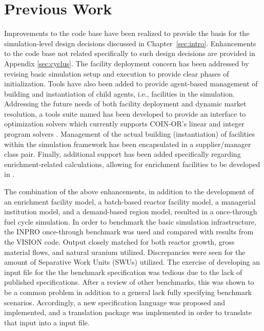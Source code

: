 \chapter{Previous Work}\label{ch:prevwork}

Improvements to the \Cyclus code base have been realized to provide the basis
for the simulation-level design decisions discussed in
Chapter~\ref{sec:intro}. Enhancements to the code base not related specifically
to such design decisions are provided in Appendix \ref{sec:cyclus}. The facility
deployment concern has been addressed by revising basic simulation setup and
execution to provide clear phases of initialization. Tools have also been added
to provide agent-based management of building and instantiation of child agents,
i.e., facilities in the \Cyclus simulation. Addressing the future needs of both
facility deployment and dynamic market resolution, a tools suite named \Cyclopts
has been developed to provide an interface to optimization solvers which
currently supports COIN-OR's linear and integer program solvers
\cite{lougee_common_2003}. Management of the actual building (instantiation) of
facilities within the simulation framework has been encapsulated in a
supplier/manager class pair. Finally, additional support has been added
specifically regarding enrichment-related calculations, allowing for enrichment
facilities to be developed in \Cycamore.

The combination of the above enhancements, in addition to the development of an
enrichment facility model, a batch-based reactor facility model, a managerial
institution model, and a demand-based region model, resulted in a \Cyclus
once-through fuel cycle simulation. In order to benchmark the basic simulation
infrastructure, the INPRO \cite{_international_2009} once-through benchmark was
used and compared with results from the VISION \cite{yacout_vision_2006}
code. Output closely matched for both reactor growth, gross material flows, and
natural uranium utilized. Discrepancies were seen for the amount of Separative
Work Units (SWUs) utilized. The exercise of developing an input file for the the
benchmark specification was tedious due to the lack of published
specifications. After a review of other benchmarks, this was shown to be a
common problem in addition to a general lack fully specifying benchmark
scenarios. Accordingly, a new specification language was proposed and
implemented, and a translation package was implemented in order to translate
that input into a \Cyclus input file.

